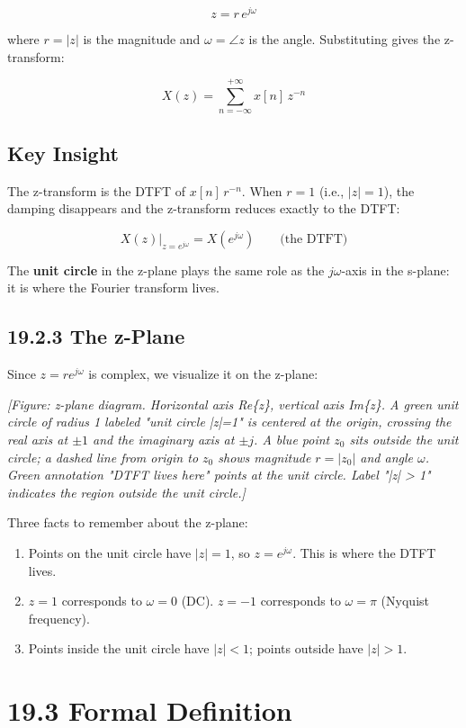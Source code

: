 \documentclass[11pt]{article}
\begin{document}
\[\boxed{z = r\, e^{j\omega}}\]

where $r = |z|$ is the magnitude and $\omega = \angle z$ is the angle. Substituting gives the z-transform:

\[\boxed{X(z) = \sum_{n=-\infty}^{+\infty} x[n]\, z^{-n}}\]

\subsection*{Key Insight}

The z-transform is the DTFT of $x[n]\, r^{-n}$. When $r = 1$ (i.e., $|z| = 1$), the damping disappears and the z-transform reduces exactly to the DTFT:

\[X(z)\bigr|_{z = e^{j\omega}} = X(e^{j\omega}) \qquad \text{(the DTFT)}\]

The \textbf{unit circle} in the z-plane plays the same role as the $j\omega$-axis in the s-plane: it is where the Fourier transform lives.

\subsection*{19.2.3 The z-Plane}

Since $z = re^{j\omega}$ is complex, we visualize it on the z-plane:

\textit{[Figure: z-plane diagram. Horizontal axis Re\{z\}, vertical axis Im\{z\}. A green unit circle of radius 1 labeled "unit circle |z|=1" is centered at the origin, crossing the real axis at $\pm 1$ and the imaginary axis at $\pm j$. A blue point $z_0$ sits outside the unit circle; a dashed line from origin to $z_0$ shows magnitude $r = |z_0|$ and angle $\omega$. Green annotation "DTFT lives here" points at the unit circle. Label "|z| > 1" indicates the region outside the unit circle.]}

Three facts to remember about the z-plane:

\begin{enumerate}
  \item Points on the unit circle have $|z| = 1$, so $z = e^{j\omega}$. This is where the DTFT lives.
  \item $z = 1$ corresponds to $\omega = 0$ (DC). $z = -1$ corresponds to $\omega = \pi$ (Nyquist frequency).
  \item Points inside the unit circle have $|z| < 1$; points outside have $|z| > 1$.
\end{enumerate}

\section*{19.3 Formal Definition}
\end{document}

